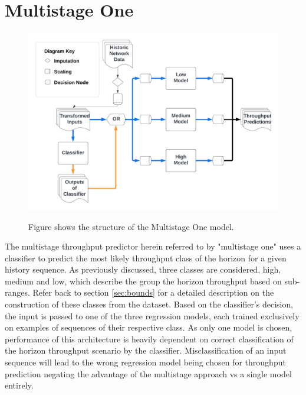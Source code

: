 \section{Multistage One}
\begin{figure}[h]
\includegraphics[scale=0.15]{Multistage One.png}
\label{fig:multistage_one}
\caption{Figure shows the structure of the Multistage One model.}
\end{figure}

The multistage throughput predictor herein referred to by "multistage one" uses a classifier to predict the most likely throughput class of the horizon for a given history sequence. As previously discussed, three classes are considered, high, medium and low, which describe the group the horizon throughput based on sub-ranges. Refer back to section \ref{sec:bounds} for a detailed description on the construction of these classes from the dataset. Based on the classifier's decision, the input is passed to one of the three regression models, each trained exclusively on examples of sequences of their respective class. As only one model is chosen, performance of this architecture is heavily dependent on correct classification of the horizon throughput scenario by the classifier. Misclassification of an input sequence will lead to the wrong regression model being chosen for throughput prediction negating the advantage of the multistage approach vs a single model entirely.

